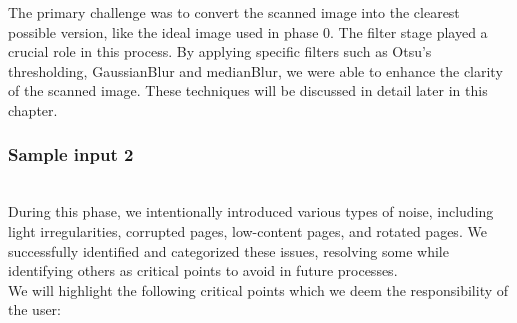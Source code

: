 \quad The primary challenge was to convert the scanned image into the clearest
possible version, like the ideal image used in phase 0. The filter stage
played a crucial role in this process. By applying specific filters such as Otsu's thresholding, GaussianBlur and medianBlur, we were able to enhance the clarity of the scanned image. These techniques will be discussed in detail later in this chapter.\\
\newpage
\hypertarget{Sample input 2}{%
\subsubsection{Sample input 2}\label{Sample input 2}}\\

\quad During this phase, we intentionally introduced various types of noise,
including light irregularities, corrupted pages, low-content pages, and
rotated pages. We successfully identified and categorized these issues,
resolving some while identifying others as critical points to avoid in
future processes.\\

\quad We will highlight the following critical points which we deem the
responsibility of the user:\\

